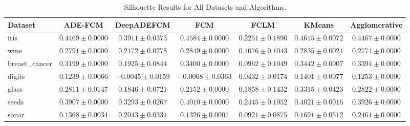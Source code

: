 \begin{table}[ht]
\centering
\caption{Silhouette Results for All Datasets and Algorithms.}
\label{tab:silhouette}
\begin{tabular}{lcccccc}
\toprule
Dataset & ADE-FCM & DeepADEFCM & FCM & FCLM & KMeans & Agglomerative \\
\midrule
iris & $0.4469\pm0.0000$ & $0.3911\pm0.0373$ & $0.4584\pm0.0000$ & $0.2251\pm0.1890$ & $0.4615\pm0.0072$ & $0.4467\pm0.0000$ \\
wine & $0.2791\pm0.0000$ & $0.2172\pm0.0278$ & $0.2849\pm0.0000$ & $0.1076\pm0.1043$ & $0.2835\pm0.0021$ & $0.2774\pm0.0000$ \\
breast_cancer & $0.3199\pm0.0000$ & $0.1925\pm0.0844$ & $0.3400\pm0.0000$ & $0.0962\pm0.1049$ & $0.3442\pm0.0007$ & $0.3394\pm0.0000$ \\
digits & $0.1239\pm0.0066$ & $-0.0045\pm0.0159$ & $-0.0068\pm0.0363$ & $0.0432\pm0.0174$ & $0.1401\pm0.0077$ & $0.1253\pm0.0000$ \\
glass & $0.2811\pm0.0147$ & $0.1846\pm0.0721$ & $0.2152\pm0.0000$ & $0.1858\pm0.1432$ & $0.3315\pm0.0423$ & $0.2822\pm0.0000$ \\
seeds & $0.3907\pm0.0000$ & $0.3293\pm0.0267$ & $0.4010\pm0.0000$ & $0.2445\pm0.1952$ & $0.4021\pm0.0016$ & $0.3926\pm0.0000$ \\
sonar & $0.1368\pm0.0034$ & $0.2043\pm0.0331$ & $0.1326\pm0.0007$ & $0.0921\pm0.0875$ & $0.1691\pm0.0512$ & $0.2461\pm0.0000$ \\
\bottomrule
\end{tabular}
\end{table}
